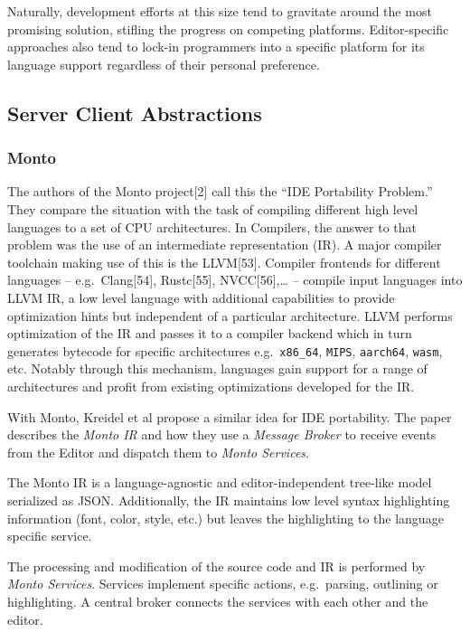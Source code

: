 \documentclass[
  a4paper,
  bibtex,
  english,
  nomenclature]{kthlatex/kththesis/kththesis}
\begin{document}
Naturally, development efforts at this size tend to gravitate around the
most promising solution, stifling the progress on competing platforms.
Editor-specific approaches also tend to lock-in programmers into a
specific platform for its language support regardless of their personal
preference.

\hypertarget{sec:server-client-abstractions}{%
\subsection{Server Client
Abstractions}\label{sec:server-client-abstractions}}

\hypertarget{sec:monto}{%
\subsubsection{Monto}\label{sec:monto}}

The authors of the Monto project{[}2{]} call this the ``IDE Portability
Problem.'' They compare the situation with the task of compiling
different high level languages to a set of CPU architectures. In
Compilers, the answer to that problem was the use of an intermediate
representation (IR). A major compiler toolchain making use of this is
the LLVM{[}53{]}. Compiler frontends for different languages --
e.g.~Clang{[}54{]}, Rustc{[}55{]}, NVCC{[}56{]},\ldots{} -- compile
input languages into LLVM IR, a low level language with additional
capabilities to provide optimization hints but independent of a
particular architecture. LLVM performs optimization of the IR and passes
it to a compiler backend which in turn generates bytecode for specific
architectures e.g.~\texttt{x86\_64}, \texttt{MIPS}, \texttt{aarch64},
\texttt{wasm}, etc. Notably through this mechanism, languages gain
support for a range of architectures and profit from existing
optimizations developed for the IR.

With Monto, Kreidel et al propose a similar idea for IDE portability.
The paper describes the \emph{Monto IR} and how they use a \emph{Message
Broker} to receive events from the Editor and dispatch them to
\emph{Monto Services}.

The Monto IR is a language-agnostic and editor-independent tree-like
model serialized as JSON. Additionally, the IR maintains low level
syntax highlighting information (font, color, style, etc.) but leaves
the highlighting to the language specific service.

The processing and modification of the source code and IR is performed
by \emph{Monto Services}. Services implement specific actions,
e.g.~parsing, outlining or highlighting. A central broker connects the
services with each other and the editor.
\end{document}
